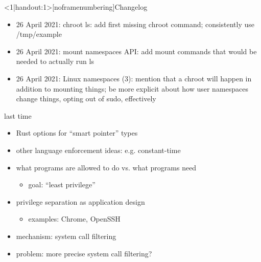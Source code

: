 \graphicspath{{./figures/}}
\usepackage{pdfpages}
\title{}
\date{}

\begin{frame}
    \titlepage
\end{frame}

{
\begin{frame}<1|handout:1>[noframenumbering]{Changelog}
    \begin{itemize}
    \item 26 April 2021: chroot ls: add first missing chroot command; consistently use /tmp/example
    \item 26 April 2021: mount namespaces API: add mount commands that would be needed to actually run ls
    \item 26 April 2021: Linux namespaces (3): mention that a chroot will happen in addition to mounting things; be more explicit about how user namespaces change things, opting out of sudo, effectively
    \end{itemize}
\end{frame}
}




\begin{frame}{last time}
    \begin{itemize}
    \item Rust options for ``smart pointer'' types
    \item other language enforcement ideas: e.g. constant-time
    \vspace{.5cm}
    \item what programs are allowed to do vs. what programs need
        \begin{itemize}
        \item goal: ``least privilege''
        \end{itemize}
    \item privilege separation as application design
        \begin{itemize}
        \item examples: Chrome, OpenSSH
        \end{itemize}
    \item mechanism: system call filtering
    \item problem: more precise system call filtering?
    \end{itemize}
\end{frame}

